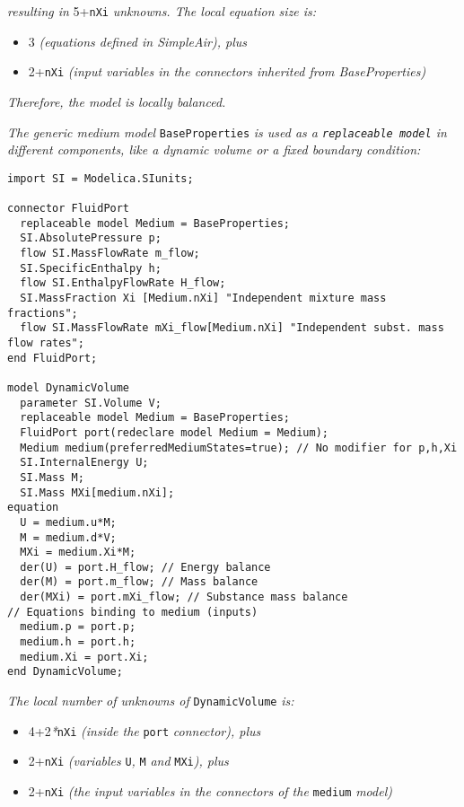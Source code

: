 \emph{resulting in} 5+\lstinline!nXi! \emph{unknowns. The local equation size
is:}

\begin{itemize}
\item
  3 \emph{(equations defined in SimpleAir), plus}
\item
  2+\lstinline!nXi! \emph{(input variables in the connectors inherited from
  BaseProperties)}
\end{itemize}

\emph{Therefore, the model is locally balanced. }

\emph{The generic medium model} \lstinline!BaseProperties! \emph{is used as a
\lstinline!replaceable model! in different components, like a dynamic
volume or a fixed boundary condition:}

\begin{lstlisting}[language=modelica]
import SI = Modelica.SIunits;

connector FluidPort
  replaceable model Medium = BaseProperties;
  SI.AbsolutePressure p;
  flow SI.MassFlowRate m_flow;
  SI.SpecificEnthalpy h;
  flow SI.EnthalpyFlowRate H_flow;
  SI.MassFraction Xi [Medium.nXi] "Independent mixture mass fractions";
  flow SI.MassFlowRate mXi_flow[Medium.nXi] "Independent subst. mass flow rates";
end FluidPort;

model DynamicVolume
  parameter SI.Volume V;
  replaceable model Medium = BaseProperties;
  FluidPort port(redeclare model Medium = Medium);
  Medium medium(preferredMediumStates=true); // No modifier for p,h,Xi
  SI.InternalEnergy U;
  SI.Mass M;
  SI.Mass MXi[medium.nXi];
equation
  U = medium.u*M;
  M = medium.d*V;
  MXi = medium.Xi*M;
  der(U) = port.H_flow; // Energy balance
  der(M) = port.m_flow; // Mass balance
  der(MXi) = port.mXi_flow; // Substance mass balance
// Equations binding to medium (inputs)
  medium.p = port.p;
  medium.h = port.h;
  medium.Xi = port.Xi;
end DynamicVolume;
\end{lstlisting}

\emph{The local number of unknowns of} \lstinline!DynamicVolume! \emph{is:}

\begin{itemize}
\item
  4+2\emph{*}\lstinline!nXi! \emph{(inside the} \lstinline!port! \emph{connector), plus}
\item
  2+\lstinline!nXi! \emph{(variables} \lstinline!U!\emph{,} \lstinline!M! \emph{and} \lstinline!MXi!\emph{),
  plus}
\item
  2+\lstinline!nXi! \emph{(the input variables in the connectors of the}
  \lstinline!medium! \emph{model)}
\end{itemize}

